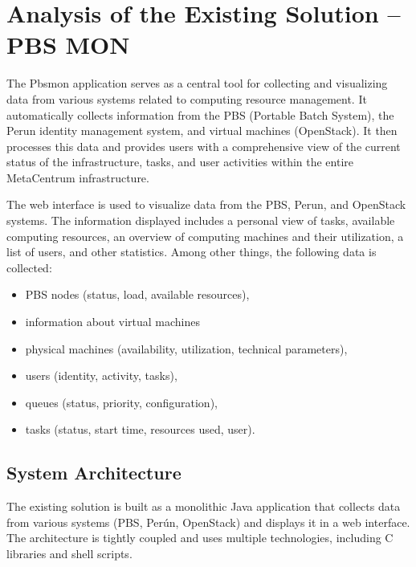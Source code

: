 \documentclass[
  digital,     %
  oneside,     %
  nosansbold,  %
  nocolorbold, %
  lof,         %
  lot,         %
]{fithesis4}
\begin{document}
\chapter{Analysis of the Existing Solution – PBS MON}
\label{chap:analysis}
The Pbsmon application serves as a central tool for collecting and visualizing data from various systems related to computing resource management. It automatically collects information from the PBS (Portable Batch System), the Perun identity management system, and virtual machines (OpenStack). It then processes this data and provides users with a comprehensive view of the current status of the infrastructure, tasks, and user activities within the entire MetaCentrum infrastructure.

The web interface is used to visualize data from the PBS, Perun, and OpenStack systems. The information displayed includes a personal view of tasks, available computing resources, an overview of computing machines and their utilization, a list of users, and other statistics. Among other things, the following data is collected:

\begin{itemize}
  \item PBS nodes (status, load, available resources),
  \item information about virtual machines
  \item physical machines (availability, utilization, technical parameters),
  \item users (identity, activity, tasks),
  \item queues (status, priority, configuration),
  \item tasks (status, start time, resources used, user).
\end{itemize}


\section{System Architecture}
\label{sec:system-architecture}
The existing solution is built as a monolithic Java application that collects data from various systems (PBS, Perún, OpenStack) and displays it in a web interface. The architecture is tightly coupled and uses multiple technologies, including C libraries and shell scripts.


\newpage
\end{document}
